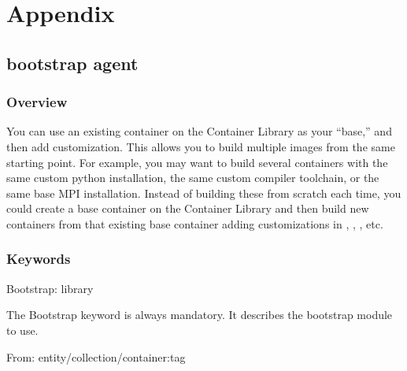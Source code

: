 \documentclass[letterpaper,10pt,english]{sphinxmanual}
\begin{document}
\chapter{Appendix}
\label{\detokenize{appendix:appendix}}\label{\detokenize{appendix::doc}}

\section{ bootstrap agent}
\label{\detokenize{appendix:library-bootstrap-agent}}\label{\detokenize{appendix:build-library-module}}

\subsection{Overview}
\label{\detokenize{appendix:overview}}\label{\detokenize{appendix:sec-build-library-module}}
You can use an existing container on the Container Library as your “base,” and
then add customization. This allows you to build multiple images from the same
starting point. For example, you may want to build several containers with the
same custom python installation, the same custom compiler toolchain, or the same
base MPI installation. Instead of building these from scratch each time, you
could create a base container on the Container Library and then build new
containers from that existing base container adding customizations in ,
, , etc.


\subsection{Keywords}
\label{\detokenize{appendix:keywords}}
%
\begin{sphinxVerbatim}[commandchars=\\\{\}]
Bootstrap: library
\end{sphinxVerbatim}

The Bootstrap keyword is always mandatory. It describes the bootstrap module to
use.

%
\begin{sphinxVerbatim}[commandchars=\\\{\}]
From: \PYGZlt{}entity\PYGZgt{}/\PYGZlt{}collection\PYGZgt{}/\PYGZlt{}container\PYGZgt{}:\PYGZlt{}tag\PYGZgt{}
\end{sphinxVerbatim}
\end{document}
